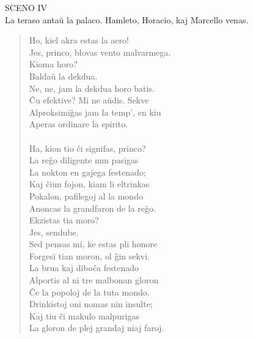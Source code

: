 \begin{center}
{\large SCENO IV}\\[1ex]

\footnotesize La teraso anta\u u la palaco. Hamleto, Horacio, kaj Marcello venas.
\end{center}

\begin{verse}
 Ho, kiel akra estas la aero!\\
 Jes, princo, blovas vento malvarmega.\\
 Kioma horo?\\
 Balda\u u la dekdua.\\
 Ne, ne, jam la dekdua horo batis.\\
 \^Cu efektive? Mi ne a\u udis. Sekve\\
                Alproksimi\^gas jam la temp', en kiu\\
                Aperas ordinare la spirito.\\
\\
 Ha, kion tio \^ci signifas, princo?\\
 La reĝo diligente nun pasigas\\
                La nokton en gajega festenado;\\
                Kaj \^ciun fojon, kiam li eltrinkas\\
                Pokalon, pafilegoj al la mondo\\
                Anoncas la grandfaron de la reĝo.\\
 Ekzistas tia moro?\\
 Jes, sendube.\\
                Sed pensas mi, ke estas pli honore\\
                Forgesi tian moron, ol \^gin sekvi.\\
                La brua kaj dibo\^ca festenado\\
                Alportis al ni tre malbonan gloron\\
                \^Ce la popoloj de la tuta mondo.\\
                Drinkistoj oni nomas nin insulte;\\
                Kaj tiu \^ci makulo malpurigas\\
                La gloron de plej grandaj niaj faroj.\\

\end{verse}

